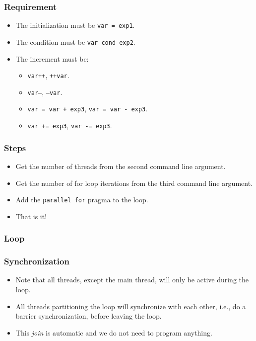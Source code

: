 \documentclass{beamer}
\begin{document}
\begin{frame}
\frametitle{Requirement}
\begin{itemize}
\item The initialization must be {\tt var = exp1}.
\item The condition must be {\tt var cond exp2}.
\item The increment must be:
  \begin{itemize}
  \item {\tt var++}, {\tt ++var}.
  \item {\tt var--}, {\tt --var}.
  \item {\tt var = var + exp3}, {\tt var = var - exp3}.
  \item {\tt var += exp3}, {\tt var -= exp3}.
  \end{itemize}
\end{itemize}
\end{frame}

\begin{frame}
\frametitle{Steps}
\begin{itemize}
\item Get the number of threads from the second command line argument.
\item Get the number of for loop iterations from the third command
  line argument.
\item Add the {\tt parallel for} pragma to the loop.
\item That is it!
\end{itemize}
\end{frame}


\begin{frame}
\frametitle{Loop} 
\end{frame}

\begin{frame}
\frametitle{Synchronization}
\begin{itemize}
\item Note that all threads, except the main thread, will only be
  active during the loop.  
\item All threads partitioning the loop will synchronize with each
  other, i.e., do a barrier synchronization, before leaving the loop.
\item This {\em join} is automatic and we do not need to program
  anything.
\end{itemize}
\end{frame}
\end{document}

